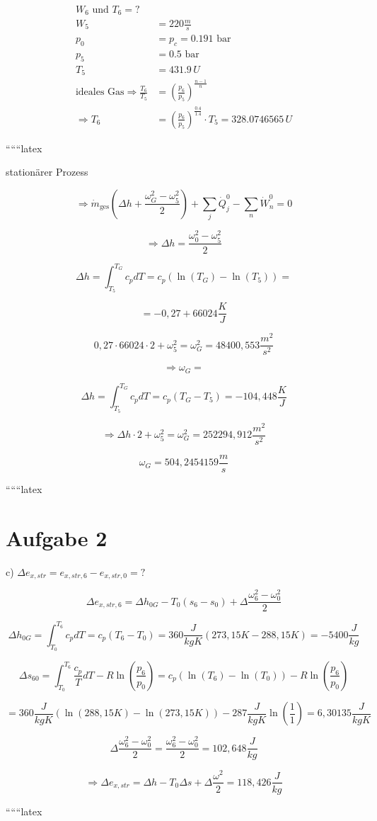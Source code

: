 \begin{align*}
    W_6 \text{ und } T_6 = ? \\
    W_5 &= 220 \frac{m}{s} \\
    p_0 &= p_c = 0.191 \text{ bar} \\
    p_5 &= 0.5 \text{ bar} \\
    T_5 &= 431.9 \, U \\
    \text{ideales Gas} \Rightarrow \frac{T_6}{T_5} &= \left( \frac{p_6}{p_5} \right)^{\frac{n-1}{n}} \\
    \Rightarrow T_6 &= \left( \frac{p_6}{p_5} \right)^{\frac{0.4}{1.4}} \cdot T_5 = 328.0746565 \, U
\end{align*}

``````latex

stationärer Prozess

\[
\Rightarrow \dot{m}_{\text{ges}} (\Delta h + \frac{\omega_G^2 - \omega_5^2}{2}) + \sum_j \dot{Q}_j^0 - \sum_n \dot{W}_n^0 = 0
\]

\[
\Rightarrow \Delta h = \frac{\omega_0^2 - \omega_5^2}{2}
\]

\[
\Delta h = \int_{T_5}^{T_G} c_p dT = c_p ( \ln(T_G) - \ln(T_5) ) = 
\]

\[
= -0,27 + 66024 \frac{K}{J}
\]

\[
0,27 \cdot 66024 \cdot 2 + \omega_5^2 = \omega_G^2 = 48400,553 \frac{m^2}{s^2}
\]

\[
\Rightarrow \omega_G = 
\]

\[
\Delta h = \int_{T_5}^{T_G} c_p dT = c_p ( T_G - T_5 ) = -104,448 \frac{K}{J}
\]

\[
\Rightarrow \Delta h \cdot 2 + \omega_5^2 = \omega_G^2 = 252294,912 \frac{m^2}{s^2}
\]

\[
\omega_G = 504,2454159 \frac{m}{s}
\]

``````latex

\section*{Aufgabe 2}

c) $\Delta e_{x,str} = e_{x,str,6} - e_{x,str,0} = ?$

\[
\Delta e_{x,str,6} = \Delta h_{0G} - T_0 (s_6 - s_0) + \Delta \frac{\omega^2_6 - \omega^2_0}{2}
\]

\[
\Delta h_{0G} = \int_{T_0}^{T_6} c_p dT = c_p (T_6 - T_0) = 360 \frac{J}{kgK} (273,15 K - 288,15 K) = -5400 \frac{J}{kg}
\]

\[
\Delta s_{60} = \int_{T_0}^{T_6} \frac{c_p}{T} dT - R \ln \left( \frac{p_6}{p_0} \right) = c_p \left( \ln(T_6) - \ln(T_0) \right) - R \ln \left( \frac{p_6}{p_0} \right)
\]

\[
= 360 \frac{J}{kgK} \left( \ln(288,15 K) - \ln(273,15 K) \right) - 287 \frac{J}{kgK} \ln \left( \frac{1}{1} \right) = 6,30135 \frac{J}{kgK}
\]

\[
\Delta \frac{\omega^2_6 - \omega^2_0}{2} = \frac{\omega^2_6 - \omega^2_0}{2} = 102,648 \frac{J}{kg}
\]

\[
\Rightarrow \Delta e_{x,str} = \Delta h - T_0 \Delta s + \Delta \frac{\omega^2}{2} = 118,426 \frac{J}{kg}
\]

``````latex


